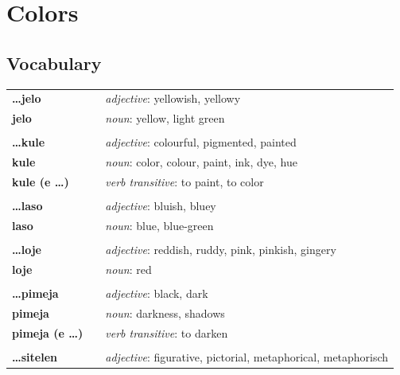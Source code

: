 \section{Colors}
%
\subsection*{Vocabulary}
%
\begin{supertabular}{p{2,5cm}|ll}
%
\textbf{\dots jelo} && \textit{adjective}: yellowish, yellowy \\ %
\textbf{jelo} && \textit{noun}: yellow, light green \\ %
 && \\ %
%
\textbf{\dots kule} && \textit{adjective}: colourful, pigmented, painted \\ %
\textbf{kule} && \textit{noun}: color, colour, paint, ink, dye, hue \\ %
\textbf{kule (e \dots)} && \textit{verb transitive}: to paint, to color \\ %
 && \\ %
%
\textbf{\dots laso} && \textit{adjective}: bluish, bluey \\ %
\textbf{laso} && \textit{noun}: blue, blue-green \\ %
 && \\ %
%
\textbf{\dots loje} && \textit{adjective}: reddish, ruddy, pink, pinkish, gingery \\ %
\textbf{loje} && \textit{noun}: red \\ %
 && \\ %
%
\textbf{\dots pimeja} && \textit{adjective}: black, dark \\ %
\textbf{pimeja} && \textit{noun}: darkness, shadows \\ %
\textbf{pimeja (e \dots)} && \textit{verb transitive}: to darken \\ %
 && \\ %
%
\textbf{\dots sitelen} && \textit{adjective}: figurative, pictorial, metaphorical, metaphorisch \\ %

\end{supertabular}
